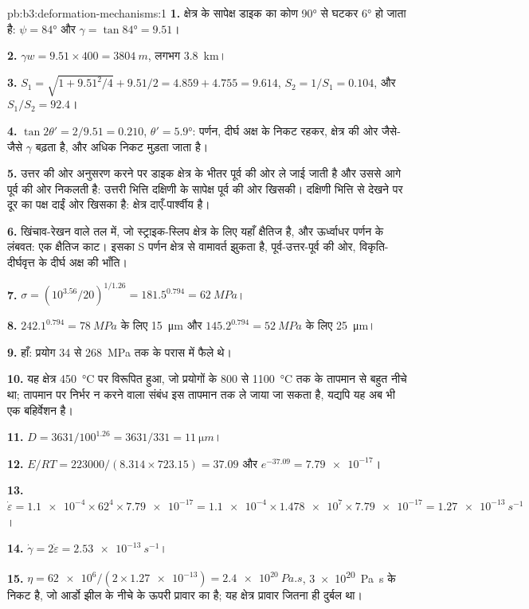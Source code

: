 \begin{solution}{pb:b3:deformation-mechanisms:1}
\textbf{1.} क्षेत्र के सापेक्ष डाइक का कोण \ang{90} से घटकर \ang{6} हो जाता है: $\psi =
\ang{84}$ और $\gamma = \tan\ang{84} = 9.51$।

\textbf{2.} $\gamma w = 9.51\times400 = \qty{3804}{m}$, लगभग \qty{3.8}{km}।

\textbf{3.} $S_1 = \sqrt{1 + 9.51^2/4} + 9.51/2 = 4.859 + 4.755 = 9.614$,
$S_2 = 1/S_1 = 0.104$, और $S_1/S_2 = 92.4$।

\textbf{4.} $\tan2\theta' = 2/9.51 = 0.210$, $\theta' = \ang{5.9}$: पर्णन,
दीर्घ अक्ष के निकट रहकर, क्षेत्र की ओर जैसे-जैसे $\gamma$ बढ़ता है,
और अधिक निकट मुड़ता जाता है।

\textbf{5.} उत्तर की ओर अनुसरण करने पर डाइक क्षेत्र के भीतर पूर्व की ओर ले जाई जाती है और
उससे आगे पूर्व की ओर निकलती है: उत्तरी भित्ति दक्षिणी के सापेक्ष पूर्व की ओर खिसकी।
दक्षिणी भित्ति से देखने पर दूर का पक्ष दाईं ओर खिसका है: क्षेत्र
दाएँ-पार्श्वीय है।

\textbf{6.} खिंचाव-रेखन वाले तल में, जो स्ट्राइक-स्लिप क्षेत्र के लिए
यहाँ क्षैतिज है, और ऊर्ध्वाधर पर्णन के लंबवत: एक क्षैतिज काट।
इसका S पर्णन क्षेत्र से वामावर्त झुकता है,
पूर्व-उत्तर-पूर्व की ओर, विकृति-दीर्घवृत्त के दीर्घ अक्ष की भाँति।

\textbf{7.} $\sigma = (10^{3.56}/20)^{1/1.26} = 181.5^{0.794} = \qty{62}{MPa}$।

\textbf{8.} $242.1^{0.794} = \qty{78}{MPa}$ के लिए \qty{15}{\micro m} और
$145.2^{0.794} = \qty{52}{MPa}$ के लिए \qty{25}{\micro m}।

\textbf{9.} हाँ: प्रयोग 34 से \qty{268}{MPa} तक के परास में फैले थे।

\textbf{10.} यह क्षेत्र \qty{450}{\celsius} पर विरूपित हुआ, जो प्रयोगों के 800 से
\qty{1100}{\celsius} तक के तापमान से बहुत नीचे था; तापमान पर निर्भर न करने वाला
संबंध इस तापमान तक ले जाया जा सकता है, यद्यपि यह अब भी एक
बहिर्वेशन है।

\textbf{11.} $D = 3631/100^{1.26} = 3631/331 = \qty{11}{\micro m}$।

\textbf{12.} $E/RT = 223000/(8.314\times723.15) = 37.09$ और $e^{-37.09} =
\num{7.79e-17}$।

\textbf{13.} $\dot\varepsilon = \num{1.1e-4}\times62^4\times\num{7.79e-17} =
\num{1.1e-4}\times\num{1.478e7}\times\num{7.79e-17} = \qty{1.27e-13}{s^{-1}}$।

\textbf{14.} $\dot\gamma = 2\dot\varepsilon = \qty{2.53e-13}{s^{-1}}$।

\textbf{15.} $\eta = \num{62e6}/(2\times\num{1.27e-13}) = \qty{2.4e20}{Pa.s}$,
\qty{3e20}{Pa.s} के निकट है, जो आर्डो झील के नीचे के ऊपरी प्रावार का है;
यह क्षेत्र प्रावार जितना ही दुर्बल था।


\end{solution}
